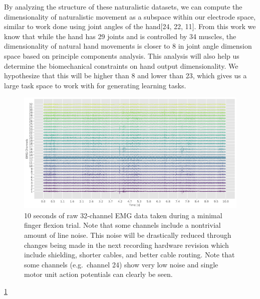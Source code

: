 \documentclass[
  a4paper,
]{article}
\begin{document}
By analyzing the structure of these naturalistic datasets, we can
compute the dimensionality of naturalistic movement as a subspace within
our electrode space, similar to work done using joint angles of the
hand{[}24, 22, 11{]}. From this work we know that while the hand has 29
joints and is controlled by 34 muscles, the dimensionality of natural
hand movements is closer to 8 in joint angle dimension space based on
principle components analysis. This analysis will also help us determine
the biomechanical constraints on hand output dimensionality. We
hypothesize that this will be higher than 8 and lower than 23, which
gives us a large task space to work with for generating learning tasks.

\begin{figure}
\hypertarget{fig:raw_data}{%
\centering
\includegraphics[width=1\textwidth,height=\textheight]{images/data_analysis/fingers/raw_data.pdf}
\caption{10 seconds of raw 32-channel EMG data taken during a minimal
finger flexion trial. Note that some channels include a nontrivial
amount of line noise. This noise will be drastically reduced through
changes being made in the next recording hardware revision which include
shielding, shorter cables, and better cable routing. Note that some
channels (e.g.~channel 24) show very low noise and single motor unit
action potentials can clearly be seen.}\label{fig:raw_data}
}
\end{figure}

\cref{fig:raw_data}
\end{document}
